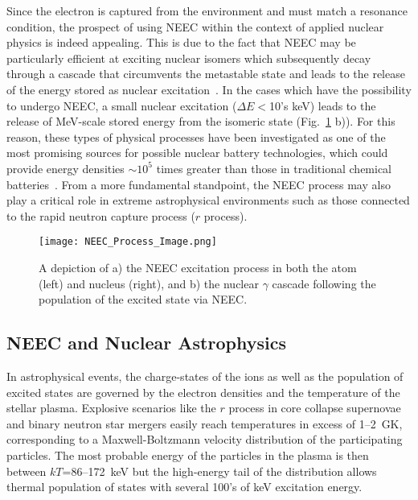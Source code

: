 \documentclass[12pt]{article}
\begin{document}
Since the electron is captured from the environment and must match a resonance condition, the prospect of using NEEC within the context of applied nuclear physics is indeed appealing.  This is due to the fact that NEEC may be particularly efficient at exciting nuclear isomers which subsequently decay through a cascade that circumvents the metastable state and leads to the release of the energy stored as nuclear excitation~\cite{Pal07}.  In the cases which have the possibility to undergo NEEC, a small nuclear excitation ($\Delta E<$10's keV) leads to the release of MeV-scale stored energy from the isomeric state (Fig.~\ref{NEECProcess} b)). For this reason, these types of physical processes have been investigated as one of the most promising sources for possible nuclear battery technologies, which could provide energy densities $\sim10^5$ times greater than those in traditional chemical batteries~\cite{Chi18,Pal07}.   From a more fundamental standpoint, the NEEC process may also play a critical role in extreme astrophysical environments such as those connected to the rapid neutron capture process ($r$ process).

\begin{figure}[!t]
  \centering
  \texttt{[image: NEEC\_Process\_Image.png]}
  \caption{\label{NEECProcess}\small A depiction of a) the NEEC excitation process in both the atom (left) and nucleus (right), and b) the nuclear $\gamma$ cascade following the population of the excited state via NEEC.}
\end{figure}

\subsection{NEEC and Nuclear Astrophysics}

In astrophysical events, the charge-states of the ions as well as the population of excited states are governed by the electron densities and the temperature of the stellar plasma.  Explosive scenarios like the $r$ process in core collapse supernovae and binary neutron star mergers easily reach temperatures in excess of 1--2~GK, corresponding to a Maxwell-Boltzmann velocity distribution of the participating particles. The most probable energy of the particles in the plasma is then between $kT$=86--172~keV but the high-energy tail of the distribution allows thermal population of states with several 100's of keV excitation energy.
\end{document}
